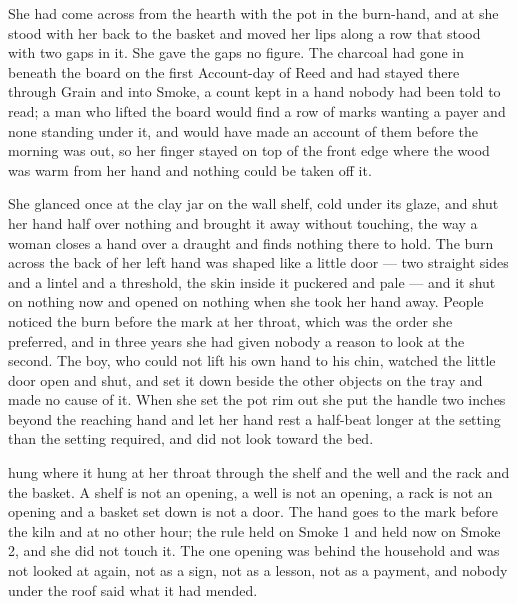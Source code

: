 \scenebreak

She had come across  from the hearth with the pot in the burn-hand, and at  she stood with her back to the basket and moved her lips along a row that stood with two gaps in it. She gave the gaps no figure. The charcoal had gone in beneath the board on the first Account-day of Reed and had stayed there through Grain and into Smoke, a count kept in a hand nobody had been told to read; a man who lifted the board would find a row of marks wanting a payer and none standing under it, and would have made an account of them before the morning was out, so her finger stayed on top of the front edge where the wood was warm from her hand and nothing could be taken off it.

She glanced once at the clay jar on the wall shelf, cold under its glaze, and shut her hand half over nothing and brought it away without touching, the way a woman closes a hand over a draught and finds nothing there to hold. The burn across the back of her left hand was shaped like a little door --- two straight sides and a lintel and a threshold, the skin inside it puckered and pale --- and it shut on nothing now and opened on nothing when she took her hand away. People noticed the burn before the mark at her throat, which was the order she preferred, and in three years she had given nobody a reason to look at the second. The boy, who could not lift his own hand to his chin, watched the little door open and shut, and set it down beside the other objects on the tray and made no cause of it. When she set the pot rim out she put the handle two inches beyond the reaching hand and let her hand rest a half-beat longer at the setting than the setting required, and did not look toward the bed.

 hung where it hung at her throat through the shelf and the well and the rack and the basket. A shelf is not an opening, a well is not an opening, a rack is not an opening and a basket set down is not a door. The hand goes to the mark before the kiln and at no other hour; the rule held on Smoke 1 and held now on Smoke 2, and she did not touch it. The one opening was behind the household and was not looked at again, not as a sign, not as a lesson, not as a payment, and nobody under the roof said what it had mended.

